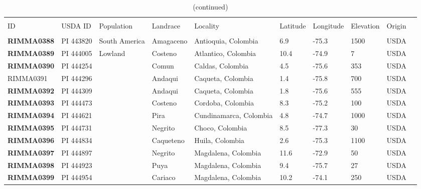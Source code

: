 \documentclass[onecolumn,oneside,letterpaper]{article}
\begin{document}
\begin{table}[h]
\begin{center}
\end{center} 

\end{table}

\clearpage

\setcounter{table}{0}
\renewcommand{\arraystretch}{1.2}

\begin{table}[h]
    \begin{center}
    \caption[]{(continued)\hspace*{11.8cm}}  
{\fontsize{7}{10}\selectfont
    \begin{tabular}{llllllllll}
        \hline\hline
       & & & \\[-4mm] 
	 ID	&	USDA ID	&	Population	&	Landrace	&	Locality	&	Latitude	&	Longitude	&	Elevation	&	Origin	\\[0.0cm]
	\hline 
	& & & \\[-4mm] 
{\bf RIMMA0388}	&	PI 443820	&	South America	&	Amagaceno	&	Antioquia, Colombia	&	6.9 	&	-75.3 	&	1500	&	USDA	\\
{\bf RIMMA0389}	&	PI 444005	&	Lowland	&	Costeno	&	Atlantico, Colombia	&	10.4 	&	-74.9 	&	7	&	USDA	\\
{\bf RIMMA0390}	&	PI 444254	&		&	Comun	&	Caldas, Colombia	&	4.5 	&	-75.6 	&	353	&	USDA	\\
RIMMA0391	&	PI 444296	&		&	Andaqui	&	Caqueta, Colombia	&	1.4 	&	-75.8 	&	700	&	USDA	\\
{\bf RIMMA0392}	&	PI 444309	&		&	Andaqui	&	Caqueta, Colombia	&	1.8 	&	-75.6 	&	555	&	USDA	\\
{\bf RIMMA0393}	&	PI 444473	&		&	Costeno	&	Cordoba, Colombia	&	8.3 	&	-75.2 	&	100	&	USDA	\\
{\bf RIMMA0394}	&	PI 444621	&		&	Pira	&	Cundinamarca, Colombia	&	4.8 	&	-74.7 	&	1000	&	USDA	\\
{\bf RIMMA0395}	&	PI 444731	&		&	Negrito	&	Choco, Colombia	&	8.5 	&	-77.3 	&	30	&	USDA	\\
{\bf RIMMA0396}	&	PI 444834	&		&	Caqueteno	&	Huila, Colombia	&	2.6 	&	-75.3 	&	1100	&	USDA	\\
{\bf RIMMA0397}	&	PI 444897	&		&	Negrito	&	Magdalena, Colombia	&	11.6 	&	-72.9 	&	50	&	USDA	\\
{\bf RIMMA0398}	&	PI 444923	&		&	Puya	&	Magdalena, Colombia	&	9.4 	&	-75.7 	&	27	&	USDA	\\
{\bf RIMMA0399}	&	PI 444954	&		&	Cariaco	&	Magdalena, Colombia	&	10.2 	&	-74.1 	&	250	&	USDA	\\

\end{tabular}}
\end{center}
\end{table}
\end{document}
